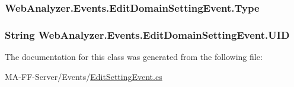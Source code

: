 \subsubsection[{Type}]{ Web\+Analyzer.\+Events.\+Edit\+Domain\+Setting\+Event.\+Type\hspace{0.3cm}{\ttfamily [get]}}\label{class_web_analyzer_1_1_events_1_1_edit_domain_setting_event_a36f36d7fa2adf9fb69c62c4dbdcf034e}
\hypertarget{class_web_analyzer_1_1_events_1_1_edit_domain_setting_event_ad1c58d61b04b924664078c684161f861}{}
\subsubsection[{U\+I\+D}]{\setlength{\rightskip}{0pt plus 5cm}String Web\+Analyzer.\+Events.\+Edit\+Domain\+Setting\+Event.\+U\+I\+D\hspace{0.3cm}{\ttfamily [get]}}\label{class_web_analyzer_1_1_events_1_1_edit_domain_setting_event_ad1c58d61b04b924664078c684161f861}


The documentation for this class was generated from the following file\+:\begin{DoxyCompactItemize}
\item 
M\+A-\/\+F\+F-\/\+Server/\+Events/\hyperlink{_edit_setting_event_8cs}{Edit\+Setting\+Event.\+cs}\end{DoxyCompactItemize}

